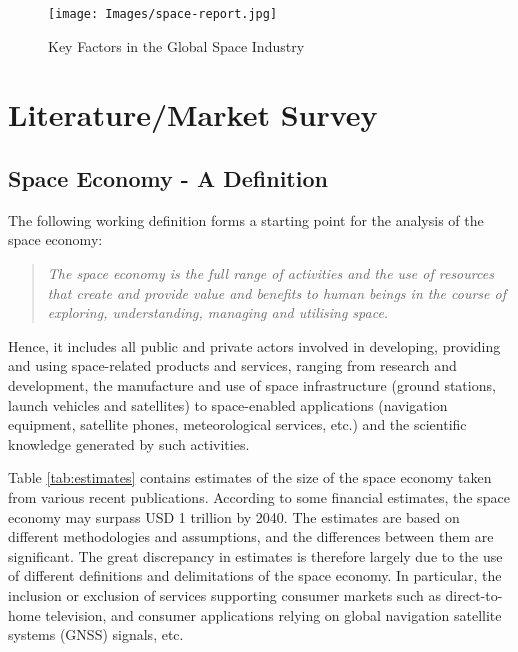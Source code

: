 \documentclass[12pt]{article}
\begin{document}
\begin{figure}[ht]
    \centering
    \texttt{[image: Images/space-report.jpg]}
    \caption{Key Factors in the Global Space Industry}
\end{figure}

\section{Literature/Market Survey}

\subsection{Space Economy - A Definition}

The following working definition forms a starting point for the analysis of the space economy:
\begin{quote}
    \textit{The space economy is the full range of activities and the use of resources that create and provide value and benefits to human beings in the course of exploring, understanding, managing and utilising space.}
\end{quote}

Hence, it includes all public and private actors involved in developing, providing and using space-related products and services, ranging from research and development, the manufacture and use of space infrastructure (ground stations, launch vehicles and satellites) to space-enabled applications (navigation equipment, satellite phones, meteorological services, etc.) and the scientific knowledge generated by such activities. 

Table \ref{tab:estimates} contains estimates of the size of the space economy taken from various recent publications. According to some financial estimates, the space economy may surpass USD 1 trillion by 2040. The estimates are based on different methodologies and assumptions, and the differences between them are significant. The great discrepancy in estimates is therefore largely due to the use of different definitions and delimitations of the space economy. In particular, the inclusion or exclusion of services supporting
consumer markets such as direct-to-home television, and consumer applications relying on global navigation satellite systems (GNSS) signals, etc.
\end{document}
